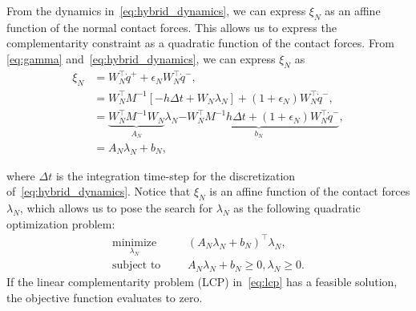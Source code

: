 From the dynamics in~\eqref{eq:hybrid_dynamics}, we can express $\xi_N$ as an
affine function of the normal contact forces. 
%
This allows us to express the complementarity constraint as a quadratic function
of the contact forces.
%
From \eqref{eq:gamma} and~\eqref{eq:hybrid_dynamics}, we can express $\xi_N$
as 
\begin{equation}
  \begin{aligned}
    \xi_N &= W_N^\top \dot{q}^+ + \epsilon_N W_N^\top \dot{q}^-, \\
    &= W_N^\top M^{-1}[-h \Delta t + W_N \lambda_N] + (1 + \epsilon_N)W_N^\top \dot{q}^-, \\
    &= \underbrace{W_N^\top M^{-1}W_N}_{A_N} \lambda_N \underbrace{-W_N^\top M^{-1}h \Delta t + (1 + \epsilon_N) W_N^\top \dot{q}^-}_{b_N}, \\
    &= A_N \lambda_N + b_N,
  \end{aligned}
  \label{eq:Ab}
\end{equation}

\noindent where $\Delta t$ is the integration time-step for the discretization
of~\eqref{eq:hybrid_dynamics}.
%
Notice that $\xi_N$ is an affine function of the contact forces $\lambda_N$,
which allows us to pose the search for $\lambda_N$ as the following quadratic
optimization problem:
\begin{equation}
  \begin{aligned}
      \underset{\lambda_N}{\textrm{minimize}} 
      & & &(A_N \lambda_N + b_N)^\top \lambda_N, \\%
      \textrm{subject to}
      & & &A_N \lambda_N + b_N \geq 0, \lambda_N \geq 0.
  \end{aligned}
  \label{eq:lcp}
\end{equation}
\noindent If the linear complementarity problem (LCP) in~\eqref{eq:lcp} has a
feasible solution, the objective function evaluates to zero.
%

